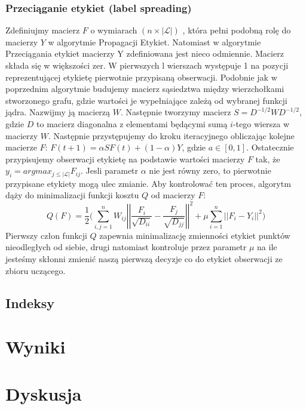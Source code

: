 \documentclass{article}
\begin{document}
\subsubsection{Przeciąganie etykiet (label spreading)}
Zdefiniujmy macierz \(F\) o wymiarach \((n \times |\mathcal{L}|)\) , która pełni podobną rolę do macierzy \(Y\) w algorytmie Propagacji Etykiet.
Natomiast w algorytmie Przeciągania etykiet macierzy Y zdefiniowana jest nieco odmiennie.
Macierz składa się w większości zer. W pierwszych l wierszach występuje 1 na pozycji reprezentującej etykietę pierwotnie przypisaną obserwacji.
Podobnie jak w poprzednim algorytmie budujemy macierz sąsiedztwa między wierzchołkami stworzonego grafu, gdzie wartości je wypełniające zależą od wybranej funkcji jądra.
Nazwijmy ją macierzą \(W\). 
Następnie tworzymy macierz \(S = D^{-1/2}WD^{-1/2}\), gdzie \(D\) to macierz diagonalna z elementami będącymi sumą \(i\)-tego wiersza w macierzy \(W\).
Następnie przystępujemy do kroku iteracyjnego obliczając kolejne macierze \(F\): \(F(t+1) = \alpha SF(t) + (1 - \alpha)Y\), gdzie \(a \in [0,1]\).
Ostatecznie przypisujemy obserwacji etykietę na podstawie wartości macierzy \(F\) tak, że \(y_i = argmax_{j\leqslant |\mathcal{L}|} F_{ij}\).
Jesli parametr \(\alpha\) nie jest równy zero, to pierwotnie przypisane etykiety mogą ulec zmianie.
Aby kontrolować ten proces, algorytm dąży do minimalizacji funkcji kosztu \(Q\) od macierzy \(F\):
\[Q(F) = \frac{1}{2}\bigg(\sum\limits^n_{i,j=1}W_{ij}\left|\left| \frac{F_i}{\sqrt{D_{ii}}} -
\frac{F_j}{\sqrt{D_{jj}}}\right|\right|^2 + \mu\sum\limits^n_{i=1}
\left|\left|F_i - Y_i\right|\right|^2 \bigg)\]
Pierwszy człon funkcji \(Q\) zapewnia minimalizację zmienności etykiet punktów nieodległych od siebie, drugi natomiast kontroluje przez parametr \(\mu\) na ile jesteśmy skłonni zmienić naszą pierwszą decyzje co do etykiet obserwacji ze zbioru uczącego.	
\subsection{Indeksy}
\section{Wyniki}
\section{Dyskusja}



\end{document}
